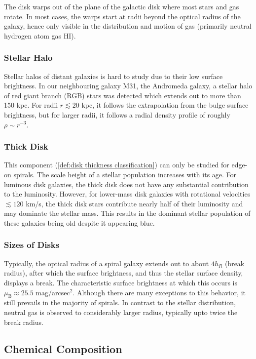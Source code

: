 \documentclass[a4paper,11pt]{report}
\begin{document}
The disk warps out of the plane of the galactic disk where most stars and gas rotate. In most cases, the warps start at radii beyond the optical radius of the galaxy, hence only visible in the distribution and motion of gas (primarily neutral hydrogen atom gas H\RN{1}).

\subsubsection{Stellar Halo}
Stellar halos of distant galaxies is hard to study due to their low surface brightness. In our neighbouring galaxy M31, the Andromeda galaxy, a stellar halo of red giant branch (RGB) stars was detected which extends out to more than 150 kpc. For radii $r \lesssim 20$ kpc, it follows the extrapolation from the bulge surface brightness, but for larger radii, it follows a radial density profile of roughly $\rho \sim r^{-3}$.

\subsubsection{Thick Disk}
This component (\ref{def:disk thickness classification}) can only be studied for edge-on spirals. The scale height of a stellar population increases with its age. For luminous disk galaxies, the thick disk does not have any substantial contribution to the luminosity. However, for lower-mass disk galaxies with rotational velocities $\lesssim 120$ km/s, the thick disk stars contribute nearly half of their luminosity and may dominate the stellar mass. This results in the dominant stellar population of these galaxies being old despite it appearing blue.

\subsubsection{Sizes of Disks}
Typically, the optical radius of a spiral galaxy extends out to about $4h_R$ (break radius), after which the surface brightness, and thus the stellar surface density, displays a break. The characteristic surface brightness at which this occurs is $\mu_\text{B} \approx 25.5$ mag/arcsec$^2$. Although there are many exceptions to this behavior, it still prevails in the majority of spirals. In contrast to the stellar distribution, neutral gas is observed to considerably larger radius, typically upto twice the break radius.

\subsection{Chemical Composition}
\end{document}
